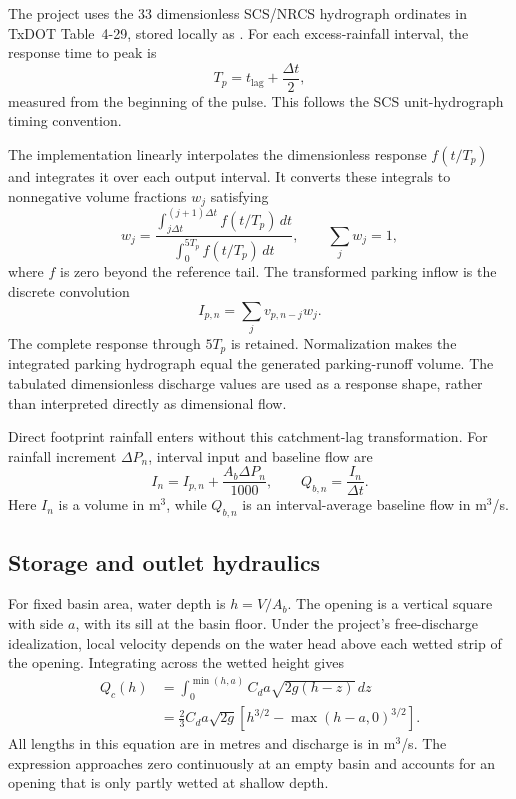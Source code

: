 \documentclass[11pt,letterpaper]{article}
\newcommand{\file}[1]{\texttt{\detokenize{#1}}}
\begin{document}
The project uses the 33 dimensionless SCS/NRCS hydrograph ordinates in TxDOT
Table~4-29, stored locally as \file{scs_dimensionless_uh.csv}.\cite{ordinates}
For each excess-rainfall interval, the response time to peak is
\begin{equation}
 T_p=t_{\mathrm{lag}}+\frac{\Delta t}{2},
 \label{eq:tp}
\end{equation}
measured from the beginning of the pulse. This follows the SCS
unit-hydrograph timing convention.\cite{uh}

The implementation linearly interpolates the dimensionless response
$f(t/T_p)$ and integrates it over each output interval. It converts these
integrals to nonnegative volume fractions $w_j$ satisfying
\begin{equation}
 w_j=\frac{\displaystyle\int_{j\Delta t}^{(j+1)\Delta t}f(t/T_p)\,dt}
 {\displaystyle\int_0^{5T_p}f(t/T_p)\,dt},\qquad \sum_j w_j=1,
 \label{eq:weights}
\end{equation}
where $f$ is zero beyond the reference tail. The transformed parking inflow is
the discrete convolution
\begin{equation}
 I_{p,n}=\sum_j v_{p,n-j}w_j.
 \label{eq:convolution}
\end{equation}
The complete response through $5T_p$ is retained. Normalization makes the
integrated parking hydrograph equal the generated parking-runoff volume.
The tabulated dimensionless discharge values are used as a response shape,
rather than interpreted directly as dimensional flow.

Direct footprint rainfall enters without this catchment-lag transformation.
For rainfall increment $\Delta P_n$, interval input and baseline flow are
\begin{equation}
 I_n=I_{p,n}+\frac{A_b\Delta P_n}{1000},\qquad
 Q_{b,n}=\frac{I_n}{\Delta t}.
 \label{eq:baseline}
\end{equation}
Here $I_n$ is a volume in m$^3$, while $Q_{b,n}$ is an interval-average
baseline flow in m$^3$/s.

\subsection{Storage and outlet hydraulics}
For fixed basin area, water depth is $h=V/A_b$. The opening is a vertical
square with side $a$, with its sill at the basin floor. Under the project's
free-discharge idealization, local velocity depends on the water head above
each wetted strip of the opening. Integrating across the wetted height gives
\begin{align}
 Q_c(h)&=\int_0^{\min(h,a)} C_d a\sqrt{2g(h-z)}\,dz\nonumber\\
 &=\frac{2}{3}C_d a\sqrt{2g}
 \left[h^{3/2}-\max(h-a,0)^{3/2}\right].
 \label{eq:outlet}
\end{align}
All lengths in this equation are in metres and discharge is in m$^3$/s.
The expression approaches zero continuously at an empty basin and accounts
for an opening that is only partly wetted at shallow depth.
\end{document}
